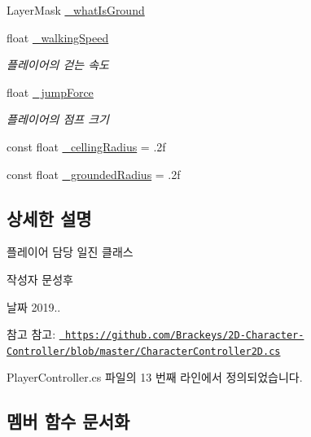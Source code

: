 \begin{DoxyCompactItemize}
\item 
Layer\+Mask \mbox{\hyperlink{class_player_controller_a9e49eccbc78237a2355490b7df08368d}{\+\_\+what\+Is\+Ground}}
\item 
float \mbox{\hyperlink{class_player_controller_a1ab6a7892eecf1a9fa7b1a49842a3dd2}{\+\_\+walking\+Speed}}
\begin{DoxyCompactList}\small\item\em 플레이어의 걷는 속도 \end{DoxyCompactList}\item 
float \mbox{\hyperlink{class_player_controller_aaec5e4333fe1c532900ca666c075261c}{\+\_\+jump\+Force}}
\begin{DoxyCompactList}\small\item\em 플레이어의 점프 크기 \end{DoxyCompactList}\item 
const float \mbox{\hyperlink{class_player_controller_a306070e77c6bcd09f4fed177c876684f}{\+\_\+celling\+Radius}} = .\+2f
\item 
const float \mbox{\hyperlink{class_player_controller_a81d04f96edabfd06d6ba1ecb26322f6a}{\+\_\+grounded\+Radius}} = .\+2f
\end{DoxyCompactItemize}


\subsection{상세한 설명}
플레이어 담당 일진 클래스 

\begin{DoxyAuthor}{작성자}
문성후 
\end{DoxyAuthor}
\begin{DoxyDate}{날짜}
2019.. 
\end{DoxyDate}
\begin{DoxySeeAlso}{참고}
참고\+: \href{https://github.com/Brackeys/2D-Character-Controller/blob/master/CharacterController2D.cs}{\texttt{ https\+://github.\+com/\+Brackeys/2\+D-\/\+Character-\/\+Controller/blob/master/\+Character\+Controller2\+D.\+cs}} 
\end{DoxySeeAlso}


Player\+Controller.\+cs 파일의 13 번째 라인에서 정의되었습니다.



\subsection{멤버 함수 문서화}
\mbox{\label{class_player_controller_a473a610cfe2a374d5cb39b3c44881d11}} 
